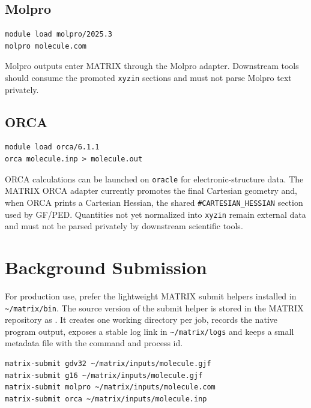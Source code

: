 \documentclass[11pt]{article}
\newcommand{\host}{\texttt{oracle}}
\newcommand{\xyzin}{\texttt{xyzin}}
\begin{document}
\subsection{Molpro}

\begin{lstlisting}[style=matrix]
module load molpro/2025.3
molpro molecule.com
\end{lstlisting}

Molpro outputs enter MATRIX through the Molpro adapter.  Downstream tools
should consume the promoted \xyzin{} sections and must not parse Molpro text
privately.

\subsection{ORCA}

\begin{lstlisting}[style=matrix]
module load orca/6.1.1
orca molecule.inp > molecule.out
\end{lstlisting}

ORCA calculations can be launched on \host{} for electronic-structure data.
The MATRIX ORCA adapter currently promotes the final Cartesian geometry and,
when ORCA prints a Cartesian Hessian, the shared
\texttt{\#CARTESIAN\_HESSIAN} section used by GF/PED.  Quantities not yet
normalized into \xyzin{} remain external data and must not be parsed privately
by downstream scientific tools.

\section{Background Submission}

For production use, prefer the lightweight MATRIX submit helpers installed in
\texttt{\textasciitilde/matrix/bin}.  The source version of the submit helper
is stored in the MATRIX repository as
.  It creates one working
directory per job, records the native program output, exposes a stable log
link in \texttt{\textasciitilde/matrix/logs} and keeps a small metadata file
with the command and process id.

\begin{lstlisting}[style=matrix]
matrix-submit gdv32 ~/matrix/inputs/molecule.gjf
matrix-submit g16 ~/matrix/inputs/molecule.gjf
matrix-submit molpro ~/matrix/inputs/molecule.com
matrix-submit orca ~/matrix/inputs/molecule.inp
\end{lstlisting}
\end{document}
